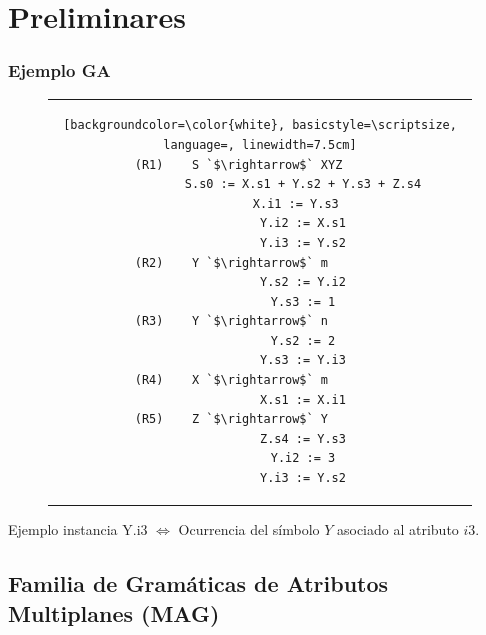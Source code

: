 \documentclass[10pt, xcolor=table]{beamer}
\begin{document}
\section{Preliminares}


\begin{frame}[fragile]
    \frametitle{Ejemplo GA}

\begin{figure}[h]
\begin{center}
\begin{tabular}{c}
\begin{lstlisting}[backgroundcolor=\color{white}, basicstyle=\scriptsize, language=, linewidth=7.5cm]
(R1)    S `$\rightarrow$` XYZ      
            S.s0 := X.s1 + Y.s2 + Y.s3 + Z.s4
            X.i1 := Y.s3  
            Y.i2 := X.s1
            Y.i3 := Y.s2
(R2)    Y `$\rightarrow$` m        
            Y.s2 := Y.i2
            Y.s3 := 1
(R3)    Y `$\rightarrow$` n        
            Y.s2 := 2
            Y.s3 := Y.i3
(R4)    X `$\rightarrow$` m        
            X.s1 := X.i1
(R5)    Z `$\rightarrow$` Y        
            Z.s4 := Y.s3
            Y.i2 := 3
            Y.i3 := Y.s2
\end{lstlisting} 
\end{tabular}
\end{center}
\end{figure}

    \pause

    \begin{block}{Ejemplo instancia}
        Y.i3 $\Leftrightarrow$ Ocurrencia del símbolo $Y$ asociado al atributo $i3$.
    \end{block}
\end{frame}

\subsection{Familia de Gramáticas de Atributos Multiplanes (MAG)}
\end{document}

